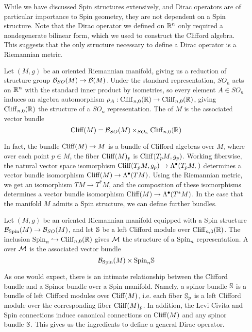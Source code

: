 While we have discussed Spin structures extensively, and Dirac operators are
of particular importance to Spin geometry, they are not dependent on a Spin structure.
Note that the Dirac operator we defined on $\R^n$ only required a nondegenerate
bilinear form, which we used to construct the Clifford algebra. This suggests
that the only structure necessary to define a Dirac operator is a Riemannian metric.
%
\begin{defn}
Let $(M,g)$ be an oriented Riemannian manifold, giving us a reduction of structure
group $\B_{SO}(M) \to \B(M)$. Under the standard representation, $SO_n$ acts on $\R^n$
with the standard inner product by isometries, so every element $A \in SO_n$ induces
an algebra automorphism  $\rho_A : \Cliff_{n,0}(\R) \to \Cliff_{n,0}(\R)$, giving
$\Cliff_{n,0}(\R)$ the structure of a $SO_n$ representation. The 
of $M$ is the associated vector bundle
\[
\Cliff(M) = \B_{SO}(M) \times_{SO_n} \Cliff_{n,0}(\R)
\]
\end{defn}
%
In fact, the bundle $\Cliff(M) \to M$ is a bundle of Clifford algebras over $M$, where
over each point $p \in M$, the fiber $\Cliff(M)_p$ is $\Cliff(T_pM, g_p)$. Working
fiberwise, the natural vector space isomorphism
$\Cliff(T_pM, g_p) \to \Lambda^\bullet(T_pM,)$ determines  a vector bundle isomorphism
$\Cliff(M) \to \Lambda^\bullet(TM)$. Using the Riemannian metric, we get an isomorphism
$TM \to T^*M$, and the composition of these isomorphisms determines a vector bundle
isomorphism $\Cliff(M) \to \Lambda^\bullet(T^*M)$. In the case that the manifold
$M$ admits a Spin structure, we can define further bundles.
%
\begin{defn}
Let $(M,g)$ be an oriented Riemannian manifold equipped with a Spin structure
$\B_{\Spin}(M) \to \B_{SO}(M)$, and let $\S$ be a left Clifford module over
$\Cliff_{n,0}(\R)$. The inclusion $\Spin_n \hookrightarrow \Cliff_{n,0}(\R)$ gives $\M$
the structure of a $\Spin_n$ representation. A  over $\M$ is the
associated vector bundle
\[
\B_\Spin(M) \times{\Spin_n} \S
\]
\end{defn}
%
As one would expect, there is an intimate relationship between the Clifford bundle
and a Spinor bundle over a Spin manifold. Namely, a spinor bundle $\S$ is a
bundle of left Clifford modules over $\Cliff(M)$, i.e. each fiber $\S_p$ is a left
Clifford module over the corresponding fiber $\Cliff(M)_p$. In addition, the
Levi-Civita and Spin connections induce canonical connections on $\Cliff(M)$ and
any spinor bundle $\S$. This gives us the ingredients to define a general
Dirac operator. \\
%

